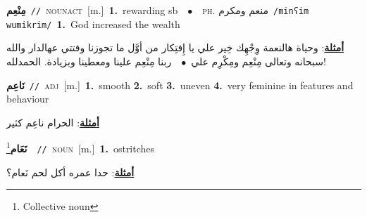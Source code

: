 \documentclass[10pt,a4paper,twoside]{article} %
\begin{document}
\begin{multicols}{2}
{\setlength\topsep{0pt}\textbf{\foreignlanguage{arabic}{مِنْعِم}}\ {\color{gray}\texttt{//}\color{black}}\ \textsc{noun\textunderscore act}\ [m.]\ \textbf{1.}~rewarding sb\ \ $\bullet$\ \ \textsc{ph.} \color{gray} \foreignlanguage{arabic}{منعم ومكرم}\color{black}\ {\color{gray}\texttt{/{\sffamily minʕim wumikrim}/}\color{black}}\ \textbf{1.}~God increased the wealth\  \begin{flushright}\color{gray}\foreignlanguage{arabic}{\textbf{\underline{\foreignlanguage{arabic}{أمثلة}}}: وحياة هالنعمة وِجْهِك خِير علي يا إِفتِكار من أوَّل ما تجوزنا وفتتي عهالدار والله سبحانه وتعالى مِنْعِم ومِكْرِم علي\ $\bullet$\ \  ربنا مِنْعِم علينا ومعطينا وبزيادة. الحمدلله!}\end{flushright}\color{black}} \vspace{2mm}

{\setlength\topsep{0pt}\textbf{\foreignlanguage{arabic}{نَاعِم}}\ {\color{gray}\texttt{//}\color{black}}\ \textsc{adj}\ [m.]\ \textbf{1.}~smooth  \textbf{2.}~soft  \textbf{3.}~uneven  \textbf{4.}~very feminine in features and behaviour\  \begin{flushright}\color{gray}\foreignlanguage{arabic}{\textbf{\underline{\foreignlanguage{arabic}{أمثلة}}}: الحرام ناعِم كثير}\end{flushright}\color{black}} \vspace{2mm}

{\setlength\topsep{0pt}\textbf{\foreignlanguage{arabic}{نَعَام}}\footnote{Collective noun}\ \ {\color{gray}\texttt{//}\color{black}}\ \textsc{noun}\ [m.]\ \textbf{1.}~ostritches\  \begin{flushright}\color{gray}\foreignlanguage{arabic}{\textbf{\underline{\foreignlanguage{arabic}{أمثلة}}}: حدا عمره أكل لحم نَعام؟}\end{flushright}\color{black}} \vspace{2mm}


\end{multicols}
\end{document}
